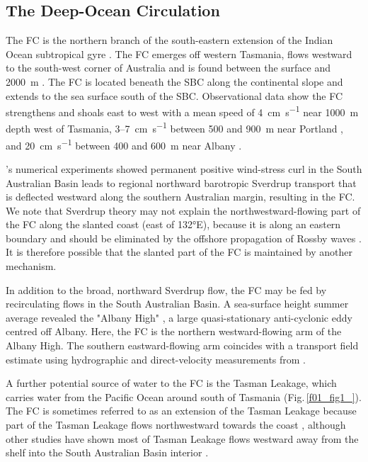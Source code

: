 \documentclass[preprint,3p,review,12pt]{elsarticle}
\newcommand{\citepos}[1]{\citeauthor{#1}'s \citeyearpar{#1}}
\begin{document}
\subsection{The Deep-Ocean Circulation} \label{The Deep-Ocean Circulation}
The FC is the northern branch of the south-eastern extension of the Indian Ocean subtropical gyre \citep{Hufford1997, McCartney2007}. The FC emerges off western Tasmania, flows westward to the south-west corner of Australia and is found between the surface and \SI{2000}{\meter} \citep{Middleton2002}. The FC is located beneath the SBC along the continental slope and extends to the sea surface south of the SBC\@.
Observational data show the FC strengthens and shoals east to west with a mean speed of \SI{4}{\centi\meter\per\second} near \SI{1000}{\meter} depth west of Tasmania, \num{3}--\SI{7}{\centi\meter\per\second} between \num{500} and \SI{900}{\meter} near Portland \citep{Middleton2007}, and \SI{20}{\centi\meter\per\second} between \num{400} and \SI{600}{\meter} near Albany \citep{Cresswell1993}.

\citepos{Middleton2002} numerical experiments showed permanent positive wind-stress curl in the South Australian Basin leads to regional northward barotropic Sverdrup transport that is deflected westward along the southern Australian margin, resulting in the FC. We note that Sverdrup theory may not explain the northwestward-flowing part of the FC along the slanted coast (east of \ang{132}E), because it is along an eastern boundary \citep{McCreary1981,McCreary1991} and should be eliminated by the offshore propagation of Rossby waves \citep{Anderson1975}. It is therefore possible that the slanted part of the FC is maintained by another mechanism.

In addition to the broad, northward Sverdrup flow, the FC may be fed by recirculating flows in the South Australian Basin. A sea-surface height summer average \citep{Middleton2003} revealed the "Albany High" \citep{Middleton2007}, a large quasi-stationary anti-cyclonic eddy centred off Albany. Here, the FC is the northern westward-flowing arm of the Albany High. The southern eastward-flowing arm coincides with a transport field estimate using hydrographic and direct-velocity measurements from \citet{McCartney2007}.

A further potential source of water to the FC is the Tasman Leakage, which carries water from the Pacific Ocean around south of Tasmania (Fig.\,\ref{f01_fig1_}). The FC is sometimes referred to as an extension of the Tasman Leakage because part of the Tasman Leakage flows northwestward towards the coast \citep{Feng2016,Middleton2002,Rosell-Fieschi2013}, although other studies have shown most of Tasman Leakage flows westward away from the shelf into the South Australian Basin interior \citep{Speich2002,vanSebille2012,vanSebille2014}.
\end{document}

